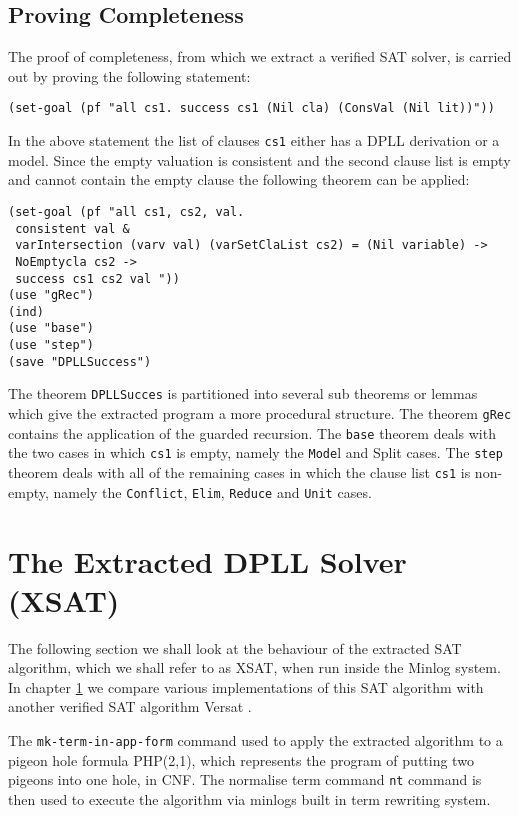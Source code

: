 \subsection*{Proving Completeness}
The proof of completeness, from which we extract a verified SAT solver, is carried out by proving the following statement:

\begin{center}
\texttt{(set-goal (pf "all cs1. success cs1 (Nil cla) (ConsVal (Nil lit))"))}
\end{center}

In the above statement the list of clauses \texttt{cs1} either has a DPLL derivation or a model. Since the empty valuation is consistent and the second clause list is empty and cannot contain the empty clause the following theorem can be applied:


\begin{lstlisting}
(set-goal (pf "all cs1, cs2, val.  
 consistent val & 
 varIntersection (varv val) (varSetClaList cs2) = (Nil variable) -> 
 NoEmptycla cs2 ->  
 success cs1 cs2 val "))
(use "gRec")
(ind)
(use "base")
(use "step")
(save "DPLLSuccess")
\end{lstlisting}

The theorem \texttt{DPLLSucces} is partitioned into several sub theorems or lemmas which give the extracted program a more procedural structure. The theorem \texttt{gRec} contains the application of the guarded recursion.  The \texttt{base} theorem deals with the two cases in which \texttt{cs1} is empty, namely the \texttt{Mode}l and Split cases. The \texttt{step} theorem deals with all of the remaining cases in which the clause list \texttt{cs1} is non-empty, namely the \texttt{Conflict}, \texttt{Elim}, \texttt{Reduce} and \texttt{Unit} cases.


\section{The Extracted DPLL Solver (XSAT)}
The following section we shall look at the behaviour of the extracted SAT algorithm, which we shall refer to as XSAT, when run inside the Minlog system. In chapter \ref{} we compare various implementations of this SAT algorithm with another verified SAT algorithm Versat \cite{DO12}.

The \texttt{mk-term-in-app-form} command used to apply the extracted algorithm to a pigeon hole formula PHP(2,1), which represents the program of putting two pigeons into one hole, in CNF. The normalise term command \texttt{nt} command is then used to execute the algorithm via minlogs built in term rewriting system.

